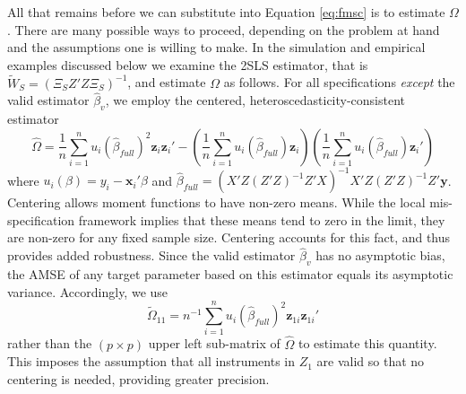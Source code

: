 \documentclass[12pt]{article}
\theoremstyle{definition}
\begin{document}
All that remains before we can substitute into Equation \ref{eq:fmsc} is to estimate $\Omega$. 
There are many possible ways to proceed, depending on the problem at hand and the assumptions one is willing to make. 
In the simulation and empirical examples discussed below we examine the 2SLS estimator, that is $\widetilde{W}_S = (\Xi_S Z'Z\Xi_S)^{-1}$, and estimate $\Omega$ as follows. 
For all specifications \emph{except} the valid estimator $\widehat{\beta}_v$, we employ the centered, heteroscedasticity-consistent estimator
\begin{equation}
	\widehat{\Omega}= \frac{1}{n}\sum_{i=1}^n u_i(\widehat{\beta}_{full})^2\mathbf{z}_i \mathbf{z}_i'  - \left(\frac{1}{n}\sum_{i=1}^n u_i(\widehat{\beta}_{full})\mathbf{z}_i   \right)\left(\frac{1}{n}\sum_{i=1}^n  u_i(\widehat{\beta}_{full})\mathbf{z}_i'  \right)
\end{equation}
where $u_i(\beta) = y_i - \mathbf{x}_i'\beta$ and $\widehat{\beta}_{full} = (X'Z(Z'Z)^{-1}Z'X)^{-1}X'Z(Z'Z)^{-1}Z'\mathbf{y}$.
Centering allows moment functions to have non-zero means. 
While the local mis-specification framework implies that these means tend to zero in the limit, they are non-zero for any fixed sample size. 
Centering accounts for this fact, and thus provides added robustness. 
Since the valid estimator $\widehat{\beta}_v$ has no asymptotic bias, the AMSE of any target parameter based on this estimator equals its asymptotic variance. 
Accordingly, we use 
\begin{equation}
	\widetilde{\Omega}_{11}= n^{-1}\sum_{i=1}^n u_i(\widehat{\beta}_{full})^2\mathbf{z}_{1i}\mathbf{z}_{1i}'
\end{equation}
rather than the $(p\times p)$ upper left sub-matrix of $\widehat{\Omega}$ to estimate this quantity. 
This imposes the assumption that all instruments in $Z_1$ are valid so that no centering is needed, providing greater precision.
\end{document}
